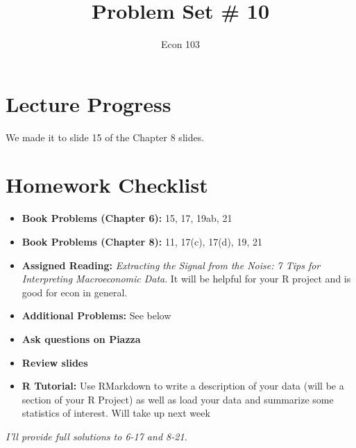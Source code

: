 \documentclass[addpoints,12pt]{exam}
\title{Problem Set \# 10}
\author{Econ 103}
\date{}
\begin{document}
\maketitle

\section*{Lecture Progress}
We made it to slide 15 of the Chapter 8 slides.

\section*{Homework Checklist}

\begin{itemize}[label = $\square$]
	\item \textbf{Book Problems (Chapter 6):} 15, 17, 19ab, 21
	\item \textbf{Book Problems (Chapter 8):} 11, 17(c), 17(d), 19, 21
	\item \textbf{Assigned Reading:} \textit{Extracting the Signal from the Noise: 7 Tips for Interpreting Macroeconomic Data}. It will be helpful for your R project and is good for econ in general.
	\item \textbf{Additional Problems: }See below
	\item \textbf{Ask questions on Piazza}
	\item\textbf{Review slides}
	\item\textbf{R Tutorial:} Use RMarkdown to write a description of your data (will be a section of your R Project) as well as load your data and summarize some statistics of interest. Will take up next week
\end{itemize}

\noindent \emph{I'll provide full  solutions to 6-17 and 8-21.}
\end{document}
